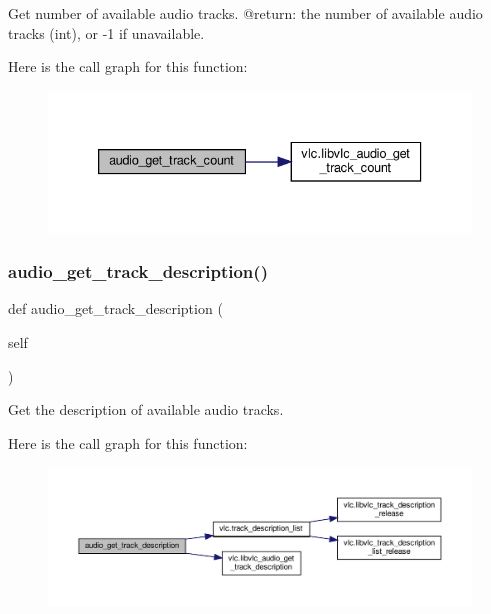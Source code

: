 \begin{DoxyVerb}Get number of available audio tracks.
@return: the number of available audio tracks (int), or -1 if unavailable.
\end{DoxyVerb}
 Here is the call graph for this function\+:
\nopagebreak
\begin{figure}[H]
\begin{center}
\leavevmode
\includegraphics[width=333pt]{classvlc_1_1_media_player_a47ac925db973be3fef872b44e76f485b_cgraph}
\end{center}
\end{figure}
\mbox{\label{classvlc_1_1_media_player_a667cc2166e0219c59571ea3b314babb9}} 
\subsubsection{\texorpdfstring{audio\+\_\+get\+\_\+track\+\_\+description()}{audio\_get\_track\_description()}}
{\footnotesize\ttfamily def audio\+\_\+get\+\_\+track\+\_\+description (\begin{DoxyParamCaption}\item[{}]{self }\end{DoxyParamCaption})}

\begin{DoxyVerb}Get the description of available audio tracks.
\end{DoxyVerb}
 Here is the call graph for this function\+:
\nopagebreak
\begin{figure}[H]
\begin{center}
\leavevmode
\includegraphics[width=350pt]{classvlc_1_1_media_player_a667cc2166e0219c59571ea3b314babb9_cgraph}
\end{center}
\end{figure}
\mbox{\label{classvlc_1_1_media_player_a445a9aa9f2b954c73c4ef24348d2e86b}} 
